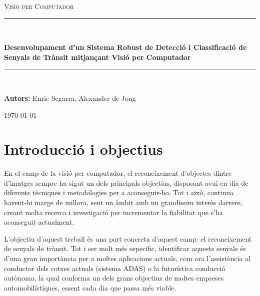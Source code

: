 \documentclass[a4paper,12pt]{article}
\begin{document}
\begin{titlepage}
    \centering
    \vspace*{1cm}
    
    {\scshape\LARGE Visió per Computador \par}
    \vspace{2cm}
    
    \rule{\linewidth}{0.5mm} \\[0.4cm]
    
    { \huge \bfseries Desenvolupament d'un Sistema Robust de Detecció i Classificació de Senyals de Trànsit mitjançant Visió per Computador \par}
    
    \rule{\linewidth}{0.5mm} \\[1.5cm]
    
    \vfill %
    
    {\Large \textbf{Autors:} Enric Segarra, Alexander de Jong \par}
    \vspace{0.5cm}
    
    {\large \today \par}
    
    \vspace*{2cm}
\end{titlepage}

\tableofcontents
\newpage




\section{Introducció i objectius}

En el camp de la visió per computador, el reconeixement d'objectes dintre d'imatges sempre ha sigut un dels principals objectius, disposant avui en dia de diferents tècniques i metodologies per a aconseguir-ho. Tot i això, continua havent-hi marge de millora, sent un àmbit amb un grandíssim interès darrere, creant molta recerca i investigació per incrementar la fiabilitat que s'ha aconseguit actualment.

L'objectiu d'aquest treball és una part concreta d'aquest camp: el reconeixement de senyals de trànsit. Tot i ser molt més específic, identificar aquests senyals és d'una gran importància per a moltes aplicacions actuals, com ara l'assistència al conductor dels cotxes actuals (sistema ADAS) o la futurística conducció autònoma, la qual conforma un dels grans objectius de moltes empreses automobilístiques, essent cada dia que passa més viable.
\end{document}
